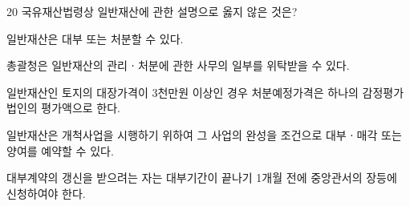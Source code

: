 \begin{question}{20}
국유재산법령상 일반재산에 관한 설명으로 옳지 않은 것은?
\begin{choices}
  \item 일반재산은 대부 또는 처분할 수 있다.
  \item 총괄청은 일반재산의 관리ㆍ처분에 관한 사무의 일부를 위탁받을 수 있다.
  \item 일반재산인 토지의 대장가격이 3천만원 이상인 경우 처분예정가격은 하나의 감정평가법인의 평가액으로 한다.
  \item 일반재산은 개척사업을 시행하기 위하여 그 사업의 완성을 조건으로 대부ㆍ매각 또는 양여를 예약할 수 있다.
  \item 대부계약의 갱신을 받으려는 자는 대부기간이 끝나기 1개월 전에 중앙관서의 장등에 신청하여야 한다.
\end{choices}
\end{question}

